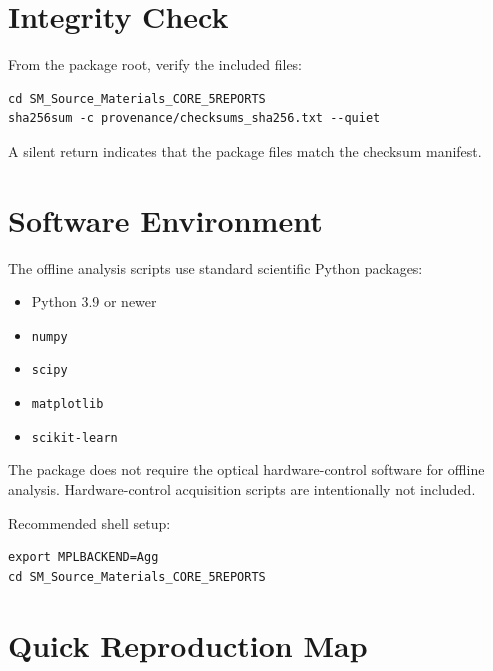 \documentclass[11pt]{article}
\begin{document}
\section*{Integrity Check}

From the package root, verify the included files:

\begin{verbatim}
cd SM_Source_Materials_CORE_5REPORTS
sha256sum -c provenance/checksums_sha256.txt --quiet
\end{verbatim}

A silent return indicates that the package files match the checksum manifest.

\section*{Software Environment}

The offline analysis scripts use standard scientific Python packages:

\begin{itemize}[leftmargin=1.5em]
  \item Python 3.9 or newer
  \item \texttt{numpy}
  \item \texttt{scipy}
  \item \texttt{matplotlib}
  \item \texttt{scikit-learn}
\end{itemize}

The package does not require the optical hardware-control software for offline
analysis. Hardware-control acquisition scripts are intentionally not included.

Recommended shell setup:

\begin{verbatim}
export MPLBACKEND=Agg
cd SM_Source_Materials_CORE_5REPORTS
\end{verbatim}

\section*{Quick Reproduction Map}
\end{document}
